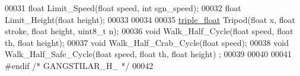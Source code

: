 \begin{DoxyCode}
00031 \textcolor{keywordtype}{float} Limit\_Speed(\textcolor{keywordtype}{float} speed, \textcolor{keywordtype}{int} sgn\_speed);
00032 \textcolor{keywordtype}{float} Limit\_Height(\textcolor{keywordtype}{float} height);
00033 
00034 
00035 \hyperlink{structtriple__float}{triple\_float} Tripod(\textcolor{keywordtype}{float} x, \textcolor{keywordtype}{float} stroke, \textcolor{keywordtype}{float} height, uint8\_t n);
00036 \textcolor{keywordtype}{void} Walk\_Half\_Cycle(\textcolor{keywordtype}{float} speed, \textcolor{keywordtype}{float} th, \textcolor{keywordtype}{float} height);
00037 \textcolor{keywordtype}{void} Walk\_Half\_Crab\_Cycle(\textcolor{keywordtype}{float} speed);
00038 \textcolor{keywordtype}{void} Walk\_Half\_Safe\_Cycle(\textcolor{keywordtype}{float} speed, \textcolor{keywordtype}{float} th, \textcolor{keywordtype}{float} height) ;
00039 
00040 
00041 \textcolor{preprocessor}{#endif }\textcolor{comment}{/* GANGSTILAR\_H\_ */}\textcolor{preprocessor}{}
00042 
\end{DoxyCode}
